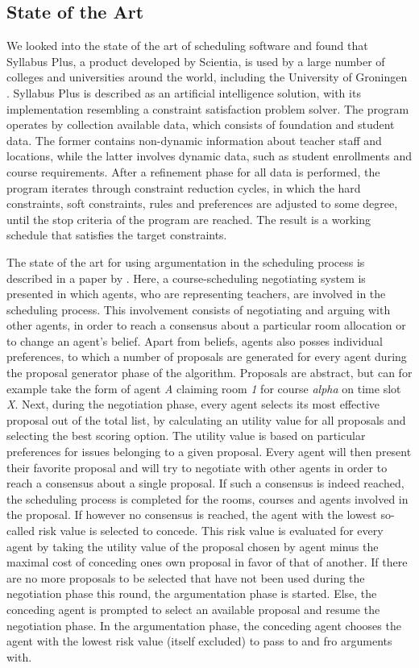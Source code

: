 \subsection{State of the Art}
We looked into the state of the art of scheduling software and found that 
Syllabus Plus, a product developed by Scientia, is used by a large number 
of colleges and universities around the world, including the University of 
Groningen \cite{SyllabusPlus}. Syllabus Plus is described as an artificial 
intelligence solution, with its implementation resembling a constraint 
satisfaction problem solver. The program operates by collection available 
data, which consists of foundation and student data. The former contains 
non-dynamic information about teacher staff and locations, while the latter 
involves dynamic data, such as student enrollments and course requirements. 
After a refinement phase for all data is performed, the program iterates 
through constraint reduction cycles, in which the hard constraints, soft 
constraints, rules and preferences are adjusted to some degree, until the 
stop criteria of the program are reached. The result is a working schedule 
that satisfies the target constraints.

The state of the art for using argumentation in the scheduling process is 
described in a paper by \cite{Kuo:jc}. Here, a course-scheduling 
negotiating system is presented in which agents, who are representing 
teachers, are involved in the scheduling process. This involvement consists 
of negotiating and arguing with other agents, in order to reach a consensus 
about a particular room allocation or to change an agent's belief. Apart 
from beliefs, agents also posses individual preferences, to which a number 
of proposals are generated for every agent during the proposal generator 
phase of the algorithm. Proposals are abstract, but can for example take 
the form of agent \textit{A} claiming room \textit{1} for course 
\textit{alpha} on time slot \textit{X}. Next, during the negotiation phase, 
every agent selects its most effective proposal out of the total list, by 
calculating an utility value for all proposals and selecting the best 
scoring option. The utility value is based on particular preferences for 
issues belonging to a given proposal. Every agent will then present their 
favorite proposal and will try to negotiate with other agents in order to 
reach a consensus about a single proposal. If such a consensus is indeed 
reached, the scheduling process is completed for the rooms, courses and 
agents involved in the proposal. If however no consensus is reached, the 
agent with the lowest so-called risk value is selected to concede. This 
risk value is evaluated for every agent by taking the utility value of the 
proposal chosen by agent minus the maximal cost of conceding ones own 
proposal in favor of that of another. If there are no more proposals to be 
selected that have not been used during the negotiation phase this round, 
the argumentation phase is started. Else, the conceding agent is prompted 
to select an available proposal and resume the negotiation phase. In the 
argumentation phase, the conceding agent chooses the agent with the lowest 
risk value (itself excluded) to pass to and fro arguments with. 


